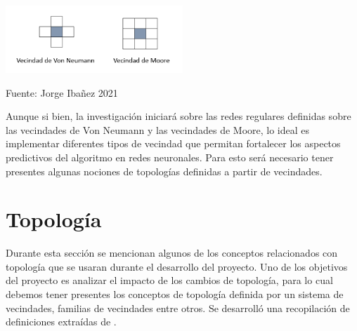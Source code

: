 \begin{center}
	\includegraphics[width=0.5\textwidth]{Imagenes/vecindades.PNG}
\end{center}
\begin{center}
    \caption{Fuente: Jorge Ibañez 2021}
\end{center}

Aunque si bien, la investigación iniciará sobre las redes regulares definidas sobre las vecindades de Von Neumann y las vecindades de Moore, lo ideal es implementar diferentes tipos de vecindad que permitan fortalecer los aspectos predictivos del algoritmo en redes neuronales. Para esto será necesario tener presentes algunas nociones de topologías definidas a partir de vecindades.

\section*{Topología}
Durante esta sección se mencionan algunos de los conceptos relacionados con topología que se usaran durante el desarrollo del proyecto. Uno de los objetivos del proyecto es analizar el impacto de los cambios de topología, para lo cual debemos tener presentes los conceptos de topología definida por un sistema de vecindades, familias de vecindades entre otros. Se desarrolló una recopilación de definiciones extraídas de \cite{filtrosTopologia,munkres,elementosTopologiaGeneral}.